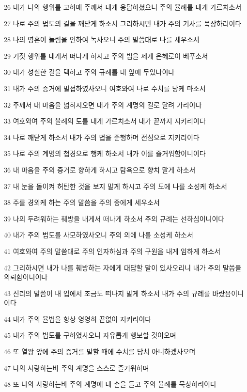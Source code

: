 \par 26 내가 나의 행위를 고하매 주께서 내게 응답하셨으니 주의 율례를 내게 가르치소서
\par 27 나로 주의 법도의 길을 깨닫게 하소서 그리하시면 내가 주의 기사를 묵상하리이다
\par 28 나의 영혼이 눌림을 인하여 녹사오니 주의 말씀대로 나를 세우소서
\par 29 거짓 행위를 내게서 떠나게 하시고 주의 법을 제게 은혜로이 베푸소서
\par 30 내가 성실한 길을 택하고 주의 규례를 내 앞에 두었나이다
\par 31 내가 주의 증거에 밀접하였사오니 여호와여 나로 수치를 당케 마소서
\par 32 주께서 내 마음을 넓히시오면 내가 주의 계명의 길로 달려 가리이다
\par 33 여호와여 주의 율례의 도를 내게 가르치소서 내가 끝까지 지키리이다
\par 34 나로 깨닫게 하소서 내가 주의 법을 준행하며 전심으로 지키리이다
\par 35 나로 주의 계명의 첩경으로 행케 하소서 내가 이를 즐거워함이니이다
\par 36 내 마음을 주의 증거로 향하게 하시고 탐욕으로 향치 말게 하소서
\par 37 내 눈을 돌이켜 허탄한 것을 보지 말게 하시고 주의 도에 나를 소성케 하소서
\par 38 주를 경외케 하는 주의 말씀을 주의 종에게 세우소서
\par 39 나의 두려워하는 훼방을 내게서 떠나게 하소서 주의 규례는 선하심이니이다
\par 40 내가 주의 법도를 사모하였사오니 주의 의에 나를 소성케 하소서
\par 41 여호와여 주의 말씀대로 주의 인자하심과 주의 구원을 내게 임하게 하소서
\par 42 그리하시면 내가 나를 훼방하는 자에게 대답할 말이 있사오리니 내가 주의 말씀을 의뢰함이니이다
\par 43 진리의 말씀이 내 입에서 조금도 떠나지 말게 하소서 내가 주의 규례를 바랐음이니이다
\par 44 내가 주의 율법을 항상 영영히 끝없이 지키리이다
\par 45 내가 주의 법도를 구하였사오니 자유롭게 행보할 것이오며
\par 46 또 열왕 앞에 주의 증거를 말할 때에 수치를 당치 아니하겠사오며
\par 47 나의 사랑하는바 주의 계명을 스스로 즐거워하며
\par 48 또 나의 사랑하는바 주의 계명에 내 손을 들고 주의 율례를 묵상하리이다

